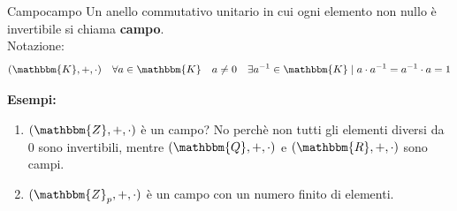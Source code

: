 \documentclass[12pt, letterpaper]{report}
\newcounter{definition}
\newcommand{\nmu}{}
\begin{document}
 		\begin{definition}{\nmu Campo}{campo}
 			Un anello commutativo unitario in cui ogni elemento non nullo è invertibile si chiama \textbf{campo}. \\
 			Notazione:
 			\[
 			(\mathbbm{K}, +, \cdot) \quad \forall a \in \mathbbm{K} \quad a \neq 0\quad \exists a^{-1} \in \mathbbm{K} \mid a \cdot a^{-1} = a^{-1} \cdot a = 1
 	 			\]
 		\end{definition}
 		\textbf{Esempi:}
 		\begin{enumerate}
 			\item $(\mathbbm{Z}, +, \cdot)$ è un campo? No perchè non tutti gli elementi diversi da 0 sono invertibili, mentre $(\mathbbm{Q}, +, \cdot)$ e $(\mathbbm{R}, +, \cdot)$ sono campi.
 			\item $(\mathbbm{Z}_p, +, \cdot)$ è un campo con un numero finito di elementi.
 		\end{enumerate}
\end{document}
